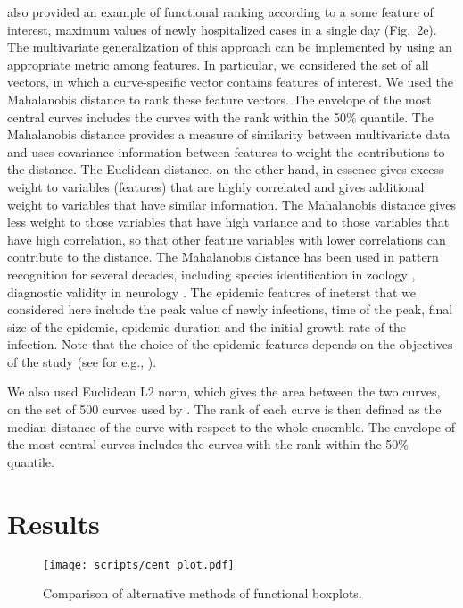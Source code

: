 \documentclass[12pt]{article}
\theoremstyle{definition} %
\begin{document}
\cite{juul2021fixed} also provided an example of functional ranking according to a some feature of interest, maximum values of newly hospitalized cases in a single day (Fig.~2e). The multivariate generalization of this approach can be implemented by using an appropriate metric among features. In particular, we considered the set of all vectors, in which a curve-spesific vector contains features of interest. We used the Mahalanobis distance \citep{mahalanobis1936generalized} to rank these feature vectors. The envelope of the most central curves includes the curves with the rank within the 50\% quantile. The Mahalanobis distance provides a measure of similarity between multivariate data and uses covariance information between features to weight the contributions to the distance. The Euclidean distance, on the other hand, in essence gives excess weight to variables (features) that are highly correlated and gives additional weight to variables that have similar information. The Mahalanobis distance gives less weight to those variables that have high variance and to those variables that have high correlation, so that other feature variables with lower correlations can contribute to the distance. The Mahalanobis distance has been used in pattern recognition for several decades,
including species identification in zoology \citep{robinson1975geographical}, diagnostic validity in neurology \citep{john1988neurometrics}. The epidemic features of ineterst that we considered here include the peak value of newly infections, time of the peak, final size of the epidemic, epidemic duration and the initial growth rate of the infection. Note that the choice of the epidemic features depends on the objectives of the study (see for e.g., \cite{probert2016decision}).

We also used Euclidean L2 norm, which gives the area between the two curves, on the set of 500 curves used by \cite{juul2021fixed}. The rank of each curve is then defined as the median distance of the curve with respect to the whole ensemble. The envelope of the most central curves includes the curves with the rank within the 50\% quantile.


\section{Results}

\begin{figure}[h!]
\centering
\texttt{[image: scripts/cent\_plot.pdf]}
\caption{Comparison of alternative methods of functional boxplots.}\label{p.a}
\end{figure}



\end{document}
